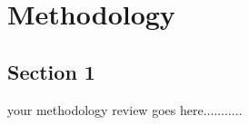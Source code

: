 \chapter{Methodology}  %

\section{Section 1} %

 

 

your methodology review goes here........... 